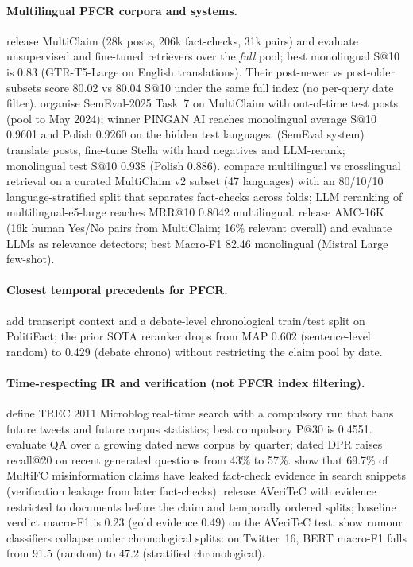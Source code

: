 \documentclass[11pt]{article}
\begin{document}
\paragraph{Multilingual PFCR corpora and systems.}
\cite{pikuliak2023multilingual} release MultiClaim (28k posts, 206k fact-checks, 31k pairs) and evaluate unsupervised and fine-tuned retrievers over the \emph{full} pool; best monolingual S@10 is 0.83 (GTR-T5-Large on English translations). Their post-newer vs post-older subsets score 80.02 vs 80.04 S@10 under the same full index (no per-query date filter).
\cite{peng2025semeval} organise SemEval-2025 Task~7 on MultiClaim with out-of-time test posts (pool to May 2024); winner PINGAN AI reaches monolingual average S@10 0.9601 and Polish 0.9260 on the hidden test languages.
\cite{devadiga2025tifin} (SemEval system) translate posts, fine-tune Stella with hard negatives and LLM-rerank; monolingual test S@10 0.938 (Polish 0.886).
\cite{ramponi2025multilingual} compare multilingual vs crosslingual retrieval on a curated MultiClaim v2 subset (47 languages) with an 80/10/10 language-stratified split that separates fact-checks across folds; LLM reranking of multilingual-e5-large reaches MRR@10 0.8042 multilingual.
\cite{vykopal2025large} release AMC-16K (16k human Yes/No pairs from MultiClaim; 16\% relevant overall) and evaluate LLMs as relevance detectors; best Macro-F1 82.46 monolingual (Mistral Large few-shot).

\paragraph{Closest temporal precedents for PFCR.}
\cite{shaar2022role} add transcript context and a debate-level chronological train/test split on PolitiFact; the prior SOTA reranker drops from MAP 0.602 (sentence-level random) to 0.429 (debate chrono) without restricting the claim pool by date.

\paragraph{Time-respecting IR and verification (not PFCR index filtering).}
\cite{ounis2011overview} define TREC 2011 Microblog real-time search with a compulsory run that bans future tweets and future corpus statistics; best compulsory P@30 is 0.4551.
\cite{liska2022streamingqa} evaluate QA over a growing dated news corpus by quarter; dated DPR raises recall@20 on recent generated questions from 43\% to 57\%.
\cite{glockner2022missing} show that 69.7\% of MultiFC misinformation claims have leaked fact-check evidence in search snippets (verification leakage from later fact-checks).
\cite{schlichtkrull2023averitec} release AVeriTeC with evidence restricted to documents before the claim and temporally ordered splits; baseline verdict macro-F1 is 0.23 (gold evidence 0.49) on the AVeriTeC test.
\cite{mu2023its} show rumour classifiers collapse under chronological splits: on Twitter~16, BERT macro-F1 falls from 91.5 (random) to 47.2 (stratified chronological).
\end{document}
